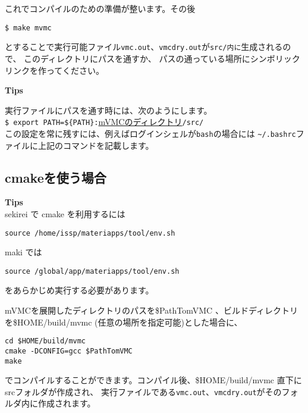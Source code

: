 これでコンパイルのための準備が整います。その後
\begin{verbatim}
$ make mvmc
\end{verbatim}

とすることで実行可能ファイル\verb|vmc.out|、\verb|vmcdry.out|が\verb|src/内に|生成されるので、
このディレクトリにパスを通すか、
パスの通っている場所にシンボリックリンクを作ってください。

\begin{screen}
\Large 
{\bf Tips}
\normalsize

実行ファイルにパスを通す時には、次のようにします。
\\
\verb|$ export PATH=${PATH}:|\underline{mVMCのディレクトリ}\verb|/src/|
\\
この設定を常に残すには、例えばログインシェルが\verb|bash|の場合には
\verb|~/.bashrc|ファイルに上記のコマンドを記載します。
\end{screen}

\subsection{cmakeを使う場合}

\begin{screen}
\Large 
{\bf Tips}
\normalsize\\
sekirei で cmake を利用するには
\begin{verbatim}
source /home/issp/materiapps/tool/env.sh
\end{verbatim}
maki では
\begin{verbatim}
source /global/app/materiapps/tool/env.sh
\end{verbatim}
をあらかじめ実行する必要があります。
\end{screen}

mVMCを展開したディレクトリのパスを\$PathTomVMC 、ビルドディレクトリを\$HOME/build/mvmc (任意の場所を指定可能)とした場合に、
\begin{verbatim}
cd $HOME/build/mvmc
cmake -DCONFIG=gcc $PathTomVMC
make
\end{verbatim}
でコンパイルすることができます。コンパイル後、\$HOME/build/mvmc 直下にsrcフォルダが作成され、
実行ファイルである\verb|vmc.out|、\verb|vmcdry.out|がそのフォルダ内に作成されます。

